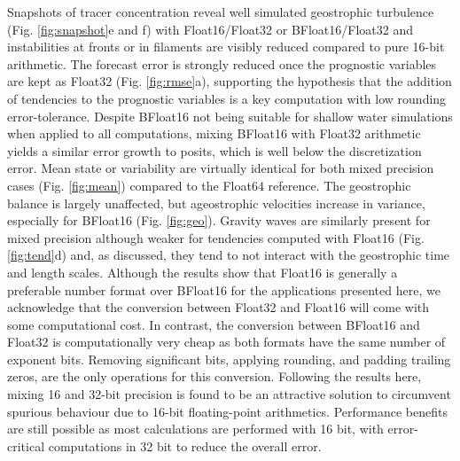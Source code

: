 \documentclass[draft]{agujournal2019}
\begin{document}
Snapshots of tracer concentration reveal well simulated geostrophic turbulence
(Fig. \ref{fig:snapshot}e and f) with Float16/Float32 or BFloat16/Float32 and
instabilities at fronts or in filaments are visibly reduced compared to pure
16-bit arithmetic. The forecast error is strongly reduced once the prognostic
variables are kept as Float32 (Fig. \ref{fig:rmse}a), supporting the hypothesis
that the addition of tendencies to the prognostic variables is a key computation
with low rounding error-tolerance. Despite BFloat16 not being suitable for shallow
water simulations when applied to all computations, mixing BFloat16 with Float32
arithmetic yields a similar error growth to posits, which is well below the
discretization error. Mean state or variability are virtually identical for both
mixed precision cases (Fig. \ref{fig:mean}) compared to the Float64 reference.
The geostrophic balance is largely unaffected, but ageostrophic velocities increase
in variance, especially for BFloat16 (Fig. \ref{fig:geo}). Gravity waves are
similarly present for mixed precision although weaker for tendencies computed
with Float16 (Fig. \ref{fig:tend}d) and, as discussed, they tend to not interact
with the geostrophic time and length scales. Although the results show that Float16
is generally a preferable number format over BFloat16 for the applications presented
here, we acknowledge that the conversion between Float32 and Float16 will come
with some computational cost. In contrast, the conversion between BFloat16 and
Float32 is computationally very cheap as both formats have the same number of
exponent bits. Removing significant bits, applying rounding, and padding
trailing zeros, are the only operations for this conversion. Following the
results here, mixing 16 and 32-bit precision is found to be an attractive solution
to circumvent spurious behaviour due to 16-bit floating-point arithmetics.
Performance benefits are still possible as most calculations are performed with
16 bit, with error-critical computations in 32 bit to reduce the overall error.

\end{document}
